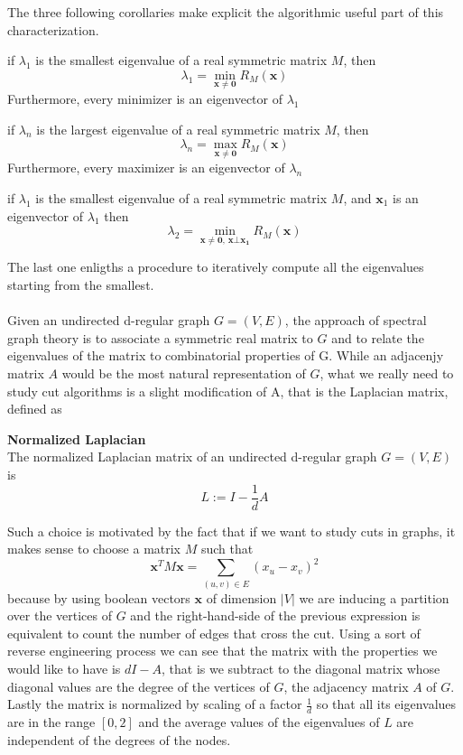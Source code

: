 The three following corollaries make explicit the algorithmic useful part of this characterization.

\begin{corollary}
	if $ \lambda_1 $ is the smallest eigenvalue of a real symmetric matrix $ M $, then
	\[ \lambda_1 = \min_{\mathbf{x} \ne \mathbf{0}}R_M(\mathbf{x}) \]
	Furthermore, every minimizer is an eigenvector of $ \lambda_1 $
\end{corollary}

\begin{corollary}
	if $ \lambda_n $ is the largest eigenvalue of a real symmetric matrix $ M $, then
	\[ \lambda_n = \max_{\mathbf{x} \ne \mathbf{0}}R_M(\mathbf{x}) \]
	Furthermore, every maximizer is an eigenvector of $ \lambda_n $
\end{corollary}

\begin{corollary}
	if $ \lambda_1 $ is the smallest eigenvalue of a real symmetric matrix $ M $, and $ \mathbf{x}_1 $ is an eigenvector of $ \lambda_1 $ then
	\[ \lambda_2 = \min_{\mathbf{x} \ne \mathbf{0}, \, \mathbf{x} \bot \mathbf{x_1}} R_M(\mathbf{x})  \]
\end{corollary}

The last one enligths a procedure to iteratively compute all the eigenvalues starting from the smallest.
\\
\\
Given an undirected d-regular graph $G=(V,E)$, the approach of spectral graph theory is to associate a symmetric real matrix to $ G $ and to relate the eigenvalues of the matrix to combinatorial properties of G. While an adjacenjy matrix $ A $ would be the most natural representation of $ G $, what we really need to study cut algorithms is a slight modification of A, that is the Laplacian matrix, defined as
\begin{definition}{\textbf{Normalized Laplacian}} \\
The normalized Laplacian matrix of an undirected d-regular graph $ G=(V,E)  $ is
\[L:= I-\frac{1}{d}A\]
\end{definition}
Such a choice is motivated by the fact that if we want to study cuts in graphs, it makes sense to choose a matrix $ M $ such that
\[\mathbf{x}^TM\mathbf{x} = \sum_{(u,v)\in E}(x_u-x_v)^2\]
because by using boolean vectors $ \mathbf{x} $ of dimension $ |V| $ we are inducing a partition over the vertices of $ G $ and the right-hand-side of the previous expression is equivalent to count the number of edges that cross the cut.
Using a sort of reverse engineering process we can see that the matrix with the properties we would like to have is $ dI-A $, that is we subtract to the diagonal matrix whose diagonal values are the degree of the vertices of $ G $, the adjacency matrix $ A $ of $ G $.
Lastly the matrix is normalized by scaling of a factor $ \frac{1}{d} $ so that all its eigenvalues are in the range $ [0,2] $ and the average values of the eigenvalues of $ L $ are independent of the degrees of the nodes.

